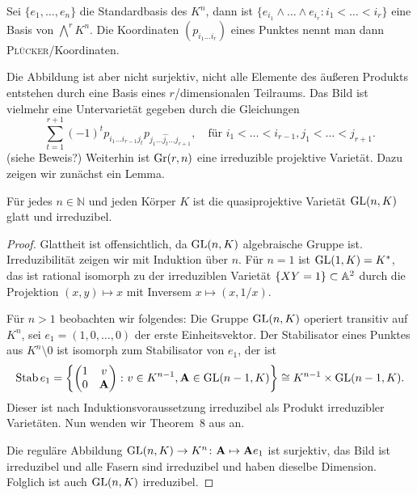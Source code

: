Sei $\{e_1, \dots, e_n\}$ die Standardbasis des $K^n$, dann ist $\{e_{i_1} \wedge \dots \wedge e_{i_r} \colon i_1 < \dots < i_r\}$ eine Basis von $\bigwedge^r K^n$. Die Koordinaten $(p_{i_1 \dots i_r})$ eines Punktes nennt man dann \textsc{Plücker}\-/Koordinaten.

Die Abbildung ist aber nicht surjektiv, nicht alle Elemente des äußeren Produkts entstehen durch eine Basis eines $r$\-/dimensionalen Teilraums. Das Bild ist vielmehr eine Untervarietät gegeben durch die Gleichungen
\begin{equation} \label{eq:grcond}
\sum_{t=1}^{r+1} (-1)^t p_{i_1 \dots i_{r-1} j_t} p_{j_1 \dots \hat{j_t} \dots j_{r+1}}, \quad\text{für } i_1 < \dots < i_{r-1}, j_1 < \dots < j_{r+1}.
\end{equation}
(siehe \cite[S.~42]{Shafarevich} \note Beweis?) Weiterhin ist $\grass r/n$ eine irreduzible projektive Varietät. Dazu zeigen wir zunächst ein Lemma.

\begin{prop}
Für jedes $n \in \mathbb N$ und jeden Körper $K$ ist die quasiprojektive Varietät $\mathrm{GL}(n,K)$ glatt und irreduzibel.
\end{prop}
\begin{proof}
Glattheit ist offensichtlich, da $\mathrm{GL}(n,K)$ algebraische Gruppe ist. Irreduzibilität zeigen wir mit Induktion über $n$. Für $n=1$ ist $\mathrm{GL}(1,K) = K^*$, das ist rational isomorph zu der irreduziblen Varietät $\{ XY = 1 \} \subset \mathbb A^{2}$ durch die Projektion $(x,y) \mapsto x$ mit Inversem $x \mapsto (x,1/x)$.

Für $n>1$ beobachten wir folgendes: Die Gruppe $\mathrm{GL}(n,K)$ operiert transitiv auf $K^n$, sei $e_1 = (1,0,\dots,0)$ der erste Einheitsvektor. Der Stabilisator eines Punktes aus $K^n \setminus 0$ ist isomorph zum Stabilisator von $e_1$, der ist
\begin{equation}
\operatorname{Stab} e_1 = \left\{ \begin{pmatrix}
1 & v \\
0 & \mathbf{A}
\end{pmatrix} \colon v \in K^{n-1}, \mathbf{A} \in \mathrm{GL}(n-1,K) \right\} \cong K^{n-1} \times \mathrm{GL}(n-1,K).
\end{equation}
Dieser ist nach Induktionsvoraussetzung irreduzibel als Produkt irreduzibler Varietäten. Nun wenden wir Theorem~8 aus \cite[S.~77]{Shafarevich} an.

Die reguläre Abbildung $\mathrm{GL}(n,K) \rightarrow K^n \colon \mathbf{A} \mapsto \mathbf{A} e_1$ ist surjektiv, das Bild ist irreduzibel und alle Fasern sind irreduzibel und haben dieselbe Dimension. Folglich ist auch $\mathrm{GL}(n,K)$ irreduzibel.
\end{proof}


